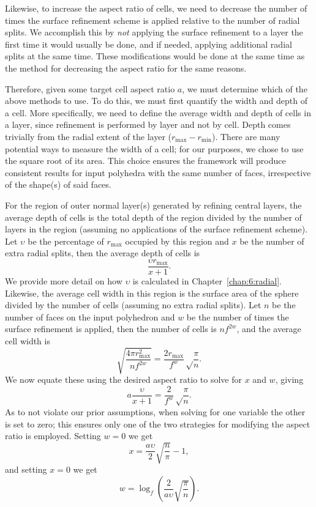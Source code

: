 Likewise, to increase the aspect ratio of cells, we need to decrease the number of times the surface refinement scheme is applied relative to the number of radial splits.
We accomplish this by \textit{not} applying the surface refinement to a layer the first time it would usually be done, and if needed, applying additional radial splits at the same time.
These modifications would be done at the same time as the method for decreasing the aspect ratio for the same reasons.


Therefore, given some target cell aspect ratio $a$, we must determine which of the above methods to use.
To do this, we must first quantify the width and depth of a cell.
More specifically, we need to define the average width and depth of cells in a layer, since refinement is performed by layer and not by cell.
Depth comes trivially from the radial extent of the layer ($r_\mathrm{max} - r_\mathrm{min}$).
There are many potential ways to measure the width of a cell; for our purposes, we chose to use the square root of its area.
This choice ensures the framework will produce consistent results for input polyhedra with the same number of faces, irrespective of the shape(s) of said faces.


For the region of outer normal layer(s) generated by refining central layers, the average depth of cells is the total depth of the region divided by the number of layers in the region (assuming no applications of the surface refinement scheme).
Let $\upsilon$ be the percentage of $r_\mathrm{max}$ occupied by this region and $x$ be the number of extra radial splits, then the average depth of cells is
%
\begin{equation*}
\frac{\upsilon r_\mathrm{max}}{x+1}.
\end{equation*}
%
We provide more detail on how $\upsilon$ is calculated in Chapter~\ref{chap:6:radial}.
Likewise, the average cell width in this region is the surface area of the sphere divided by the number of cells (assuming no extra radial splits).
Let $n$ be the number of faces on the input polyhedron and $w$ be the number of times the surface refinement is applied, then the number of cells is $n f^{2w}$, and the average cell width is
%
\begin{equation*}
\sqrt{ \frac{ 4 \pi r_\mathrm{max}^2 }{ n f^{2 w} } } = \frac{2 r_\mathrm{max}}{f^w} \sqrt\frac{\pi}{n}.
\end{equation*}
%
We now equate these using the desired aspect ratio to solve for $x$ and $w$, giving
%
\begin{equation*}
a \frac{\upsilon}{x+1} = \frac{2}{f^w} \sqrt\frac{\pi}{n}.
\end{equation*}
%
As to not violate our prior assumptions, when solving for one variable the other is set to zero; this ensures only one of the two strategies for modifying the aspect ratio is employed.
Setting $w = 0$ we get
%
\begin{equation} \label{eq:extraSplits}
x = \frac{a \upsilon}{2} \sqrt{\frac{n}{\pi}} - 1,
\end{equation}
%
and setting $x = 0$ we get
%
\begin{equation} \label{eq:extraSurface}
w = \log_{f} \left( \frac{2}{a \upsilon} \sqrt{ \frac{\pi}{n}} \right).
\end{equation}


